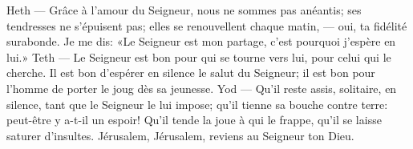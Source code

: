 Heth --- Grâce à l’amour du Seigneur, nous ne sommes pas anéantis;
		ses tendresses ne s’épuisent pas;
	elles se renouvellent chaque matin, --- oui, ta fidélité surabonde.
	Je me dis: «Le Seigneur est mon partage, c’est pourquoi j’espère en lui.»
Teth --- Le Seigneur est bon pour qui se tourne vers lui, pour celui qui le cherche.
	Il est bon d’espérer en silence le salut du Seigneur;
	il est bon pour l’homme de porter le joug dès sa jeunesse.
Yod --- Qu’il reste assis, solitaire, en silence, tant que le Seigneur le lui impose;
	qu’il tienne sa bouche contre terre: peut-être y a-t-il un espoir!
	Qu’il tende la joue à qui le frappe, qu’il se laisse saturer d’insultes.
Jérusalem, Jérusalem, reviens au Seigneur ton Dieu.
